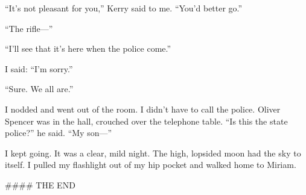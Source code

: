 {“It’s not pleasant for you,” Kerry said to me. “You’d better go.”

“The rifle—”

“I’ll see that it’s here when the police come.”

I said: “I’m sorry.”

“Sure. We all are.”

I nodded and went out of the room. I didn’t have to call the police. Oliver Spencer was in the hall, crouched over the telephone table. “Is this the state police?” he said. “My son—”

I kept going. It was a clear, mild night. The high, lopsided moon had the sky to itself. I pulled my flashlight out of my hip pocket and walked home to Miriam.

#### THE END 
}

\vspace{2\nbs}
\clearpage
\thispagestyle{empty}


